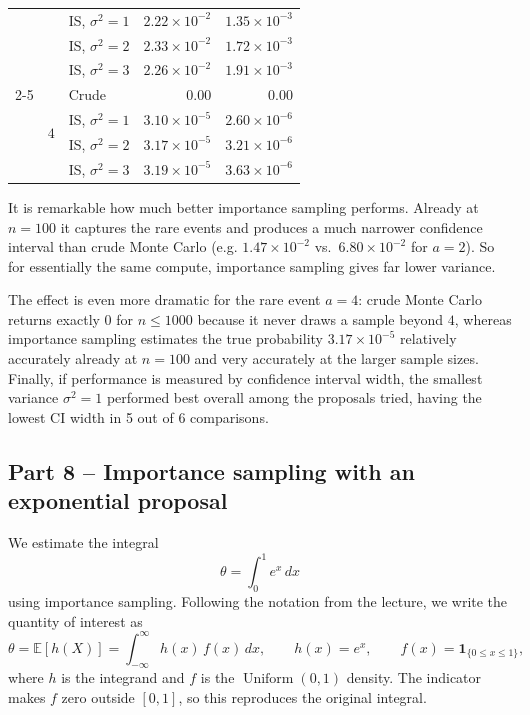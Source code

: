 \begin{table}[h]
\begin{tabular}{cclrr}
 &                      & IS, $\sigma^2=1$ & $2.22\times10^{-2}$ & $1.35\times10^{-3}$ \\
 &                      & IS, $\sigma^2=2$ & $2.33\times10^{-2}$ & $1.72\times10^{-3}$ \\
 &                      & IS, $\sigma^2=3$ & $2.26\times10^{-2}$ & $1.91\times10^{-3}$ \\
\cmidrule(l){2-5}
 & \multirow{4}{*}{$4$} & Crude            & $0.00$              & $0.00$ \\
 &                      & IS, $\sigma^2=1$ & $3.10\times10^{-5}$ & $2.60\times10^{-6}$ \\
 &                      & IS, $\sigma^2=2$ & $3.17\times10^{-5}$ & $3.21\times10^{-6}$ \\
 &                      & IS, $\sigma^2=3$ & $3.19\times10^{-5}$ & $3.63\times10^{-6}$ \\
\bottomrule
\end{tabular}
\end{table}

It is remarkable how much better importance sampling performs. Already at $n=100$ it captures the rare events and produces a much narrower confidence interval than crude Monte Carlo (e.g. $1.47\times10^{-2}$ vs.\ $6.80\times10^{-2}$ for $a=2$). So for essentially the same compute, importance sampling gives far lower variance.

The effect is even more dramatic for the rare event $a=4$: crude Monte Carlo returns exactly $0$ for $n \le 1000$ because it never draws a sample beyond $4$, whereas importance sampling estimates the true probability $3.17\times10^{-5}$ relatively accurately already at $n=100$ and very accurately at the larger sample sizes. Finally, if performance is measured by confidence interval width, the smallest variance $\sigma^2 = 1$ performed best overall among the proposals tried, having the lowest CI width in 5 out of 6 comparisons.

\subsection*{Part 8 -- Importance sampling with an exponential proposal}
We estimate the integral
\[
\theta = \int_0^1 e^x \, dx
\]
using importance sampling. Following the notation from the lecture,
we write the quantity of interest as
\[
\theta = \mathbb{E}[h(X)] = \int_{-\infty}^{\infty} h(x)\,f(x)\,dx,
\qquad
h(x) = e^x,
\qquad
f(x) = \mathbf{1}_{\{0 \le x \le 1\}},
\]
where $h$ is the integrand and $f$ is the $\operatorname{Uniform}(0,1)$ density. The indicator makes
$f$ zero outside $[0,1]$, so this reproduces the original integral.

